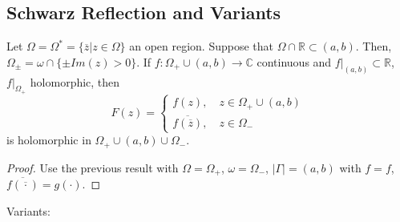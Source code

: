 \documentclass[12pt]{scrartcl}
\newcommand{\R}{\mathbb{R}}
\newcommand{\C}{\mathbb C}
\let \ol \overline
\begin{document}
\subsection{Schwarz Reflection and Variants}
Let $\Omega = \Omega^* = \{\ol{z}| z \in \Omega\}$ an open region.  Suppose that $\Omega \cap \R \subset (a, b)$.  
Then, $\Omega_\pm = \omega \cap \{\pm Im(z) > 0\}$.  If $f: \Omega_+ \cup (a, b) \to \C$ continuous and $f \vert_{(a, b)} \subset \R$, $f \vert_{\Omega_+}$ holomorphic, then $$F(z) = \begin{cases} f(z), \quad z \in \Omega_+ \cup (a, b) \\
\ol{f(\ol{z})}, \quad z \in \Omega_-
\end{cases}$$
is holomorphic in $\Omega_+ \cup (a, b) \cup \Omega_-$.
\begin{proof}
Use the previous result with $\Omega = \Omega_+$, $\omega = \Omega_-$, $|\Gamma| = (a, b)$ with $f = f$, $\ol{f(\ol{\cdot})} = g(\cdot)$.
\end{proof}
Variants:
\end{document}
